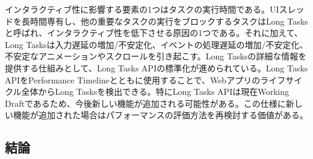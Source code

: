インタラクティブ性に影響する要素の1つはタスクの実行時間である。UIスレッドを長時間専有し、他の重要なタスクの実行をブロックするタスクはLong Tasksと呼ばれ、インタラクティブ性を低下させる原因の1つである。それに加えて、Long Tasksは入力遅延の増加/不安定化、イベントの処理遅延の増加/不安定化、不安定なアニメーションやスクロールを引き起こす。Long Tasksの詳細な情報を提供する仕組みとして、Long Tasks APIの標準化が進められている。Long Tasks APIをPerformance Timelineとともに使用することで、Webアプリのライフサイクル全体からLong Tasksを検出できる。特にLong Tasks APIは現在Working Draftであるため、今後新しい機能が追加される可能性がある。この仕様に新しい機能が追加された場合はパフォーマンスの評価方法を再検討する価値がある。

\subsection{結論}
\label{subsection:結論}
